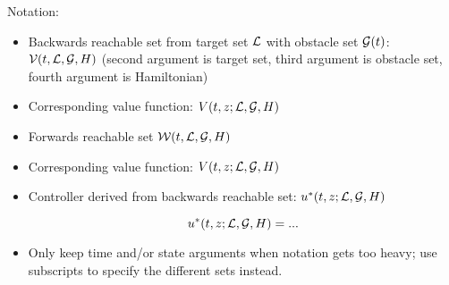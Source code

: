 Notation:
\begin{itemize}
\item Backwards reachable set from target set $\mathcal{L}$ with obstacle set $\mathcal{G}(t)$: $\mathcal{V}(t, \mathcal{L}, \mathcal{G}, H)$ (second argument is target set, third argument is obstacle set, fourth argument is Hamiltonian)
\item Corresponding value function: $V(t, z; \mathcal{L}, \mathcal{G}, H)$
\item Forwards reachable set $\mathcal{W}(t, \mathcal{L}, \mathcal{G}, H)$
\item Corresponding value function: $V(t, z; \mathcal{L}, \mathcal{G}, H)$
\item Controller derived from backwards reachable set: $u^*(t, z; \mathcal{L}, \mathcal{G}, H)$

\begin{equation}
\label{eq:opt_ctrl}
\ctrl^*(t, \state; \targetset, \obsset, \ham) = ...
\end{equation}

\item Only keep time and/or state arguments when notation gets too heavy; use subscripts to specify the different sets instead.
\end{itemize}